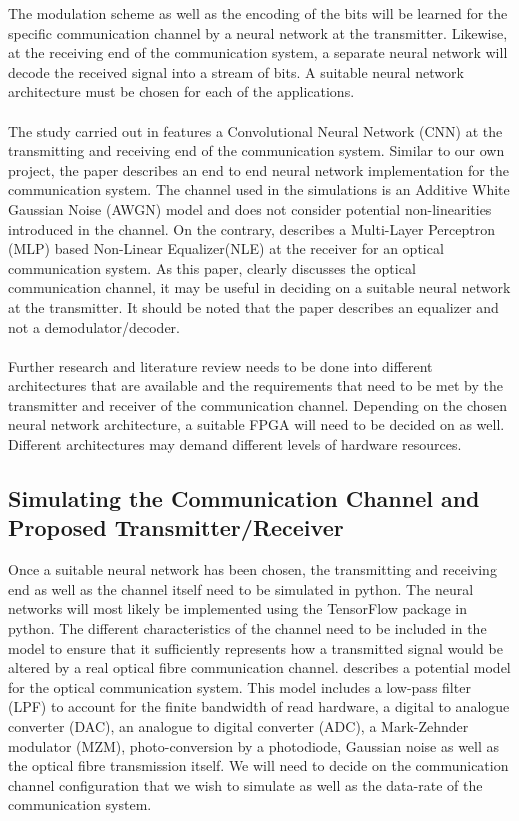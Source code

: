 The modulation scheme as well as the encoding of the bits will be learned for the specific communication channel by a neural network at the transmitter. Likewise, at the receiving end of the communication system, a separate neural network will decode the received signal into a stream of bits. A suitable neural network architecture must be chosen for each of the applications. 
\\
\\
The study carried out in \autocite{8664650} features a Convolutional Neural Network (CNN) at the transmitting and receiving end of the communication system. Similar to our own project, the paper describes an end to end neural network implementation for the communication system. The channel used in the simulations is an Additive White Gaussian Noise (AWGN) model and does not consider potential non-linearities introduced in the channel. On the contrary, \autocite{6975096} describes a Multi-Layer Perceptron (MLP) based Non-Linear Equalizer(NLE) at the receiver for an optical communication system. As this paper, clearly discusses the optical communication channel, it may be useful in deciding on a suitable neural network at the transmitter. It should be noted that the paper describes an equalizer and not a demodulator/decoder. 
\\
\\
Further research and literature review needs to be done into different architectures that are available and the requirements that need to be met by the transmitter and receiver of the communication channel. Depending on the chosen neural network architecture, a suitable FPGA will need to be decided on as well. Different architectures may demand different levels of hardware resources.

\subsection{Simulating the Communication Channel and Proposed Transmitter/Receiver}

Once a suitable neural network has been chosen, the transmitting and receiving end as well as the channel itself need to be simulated in python. The neural networks will most likely be implemented using the TensorFlow package in python. The different characteristics of the channel need to be included in the model to ensure that it sufficiently represents how a transmitted signal would be altered by a real optical fibre communication channel. \autocite{8433895} describes a potential model for the optical communication system. This model includes a low-pass filter (LPF) to account for the finite bandwidth of read hardware, a digital to analogue converter (DAC), an analogue to digital converter (ADC), a Mark-Zehnder modulator (MZM), photo-conversion by a photodiode, Gaussian noise as well as the optical fibre transmission itself. We will need to decide on the communication channel configuration that we wish to simulate as well as the data-rate of the communication system. 

